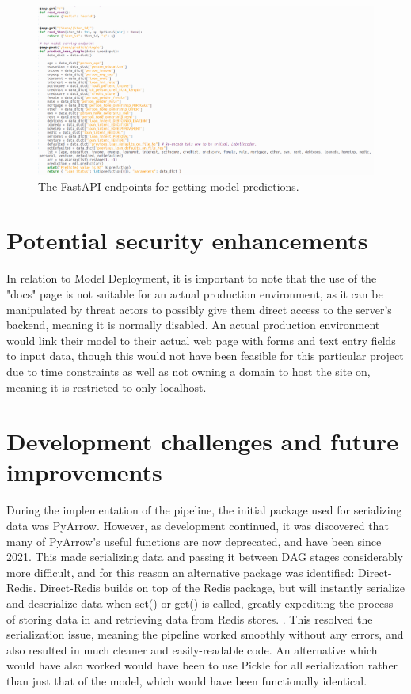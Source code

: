 \documentclass[12pt]{report}
\begin{document}
\begin{figure}[H]
    \centering
    \includegraphics[width=\linewidth]{Implementation/FastAPI+Uvi/Code.png}
    \caption{The FastAPI endpoints for getting model predictions.}
    \label{fig:UviCode}
\end{figure}




\section{Potential security enhancements}\label{sec:SecurityEnhancements}
In relation to Model Deployment, it is important to note that the use of the "docs" page is not suitable for an actual production 
environment, as it can be manipulated by threat actors to possibly give them direct access to the 
server's backend, meaning it is normally disabled. An actual production environment would link their 
model to their actual web page with forms and text entry fields to input data, though this would not 
have been feasible for this particular project due to time constraints as well as not owning a domain 
to host the site on, meaning it is restricted to only localhost.


\section{Development challenges and future improvements}
During the implementation of the pipeline, the initial package used for serializing data was PyArrow.
However, as development continued, it was discovered that many of PyArrow's useful functions are now 
deprecated, and have been since 2021. This made serializing data and passing it between DAG stages considerably more difficult, 
and for this reason an alternative package was identified: Direct-Redis. Direct-Redis builds on top of the Redis 
package, but will instantly serialize and deserialize data when set() or get() is called, greatly expediting 
the process of storing data in and retrieving data from Redis stores. \autocite{direct-redis_direct-redis_nodate}.
This resolved the serialization issue, meaning the pipeline worked smoothly without any errors, and also 
resulted in much cleaner and easily-readable code. An alternative which would have also worked would have been to 
use Pickle for all serialization rather than just that of the model, which would have been functionally identical.
\end{document}
